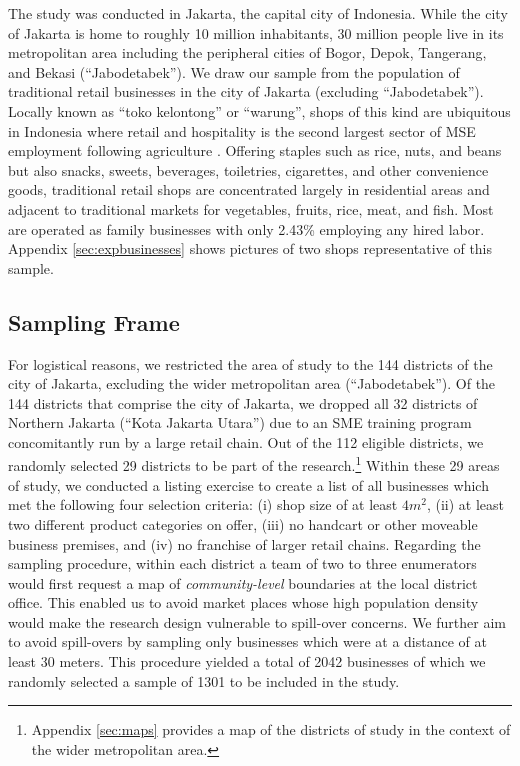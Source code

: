 \documentclass[11.5pt]{article}
\begin{document}
The study was conducted in Jakarta, the capital city of Indonesia. While the city of Jakarta is home to roughly 10 million inhabitants, 30 million people live in its metropolitan area including the peripheral cities of Bogor, Depok, Tangerang, and Bekasi (``Jabodetabek''). We draw our sample from the population of traditional retail businesses in the city of Jakarta (excluding ``Jabodetabek''). Locally known as ``toko kelontong'' or ``warung'', shops of this kind are ubiquitous in Indonesia where retail and hospitality is the second largest sector of MSE employment following agriculture \citep{StatistikUMKM2011}. Offering staples such as rice, nuts, and beans but also snacks, sweets, beverages, toiletries, cigarettes, and other convenience goods, traditional retail shops are concentrated largely in residential areas and adjacent to traditional markets for vegetables, fruits, rice, meat, and fish. Most are operated as family businesses with only 2.43\% employing any hired labor. Appendix \ref{sec:expbusinesses} shows pictures of two shops representative of this sample.


\subsection{Sampling Frame}

For logistical reasons, we restricted the area of study to the 144 districts of the city of Jakarta, excluding the wider metropolitan area (``Jabodetabek''). Of the 144 districts that comprise the city of Jakarta, we dropped all 32 districts of Northern Jakarta (``Kota Jakarta Utara'') due to an SME training program concomitantly run by a large retail chain. Out of the 112 eligible districts, we randomly selected 29 districts to be part of the research.\footnote{Appendix \ref{sec:maps} provides a map of the districts of study in the context of the wider metropolitan area.} Within these 29 areas of study, we conducted a listing exercise to create a list of all businesses which met the following four selection criteria: (i) shop size of at least $4m^2$, (ii) at least two different product categories on offer, %
(iii) no handcart or other moveable business premises, and (iv) no franchise of larger retail chains. Regarding the sampling procedure, within each district a team of two to three enumerators would first request a map of \textit{community-level} boundaries at the local district office. This enabled us to avoid market places whose high population density would make the research design vulnerable to spill-over concerns. We further aim to avoid spill-overs by sampling only businesses which were at a distance of at least 30 meters. This procedure yielded a total of 2042 businesses of which we randomly selected a sample of 1301 to be included in the study.
\end{document}
